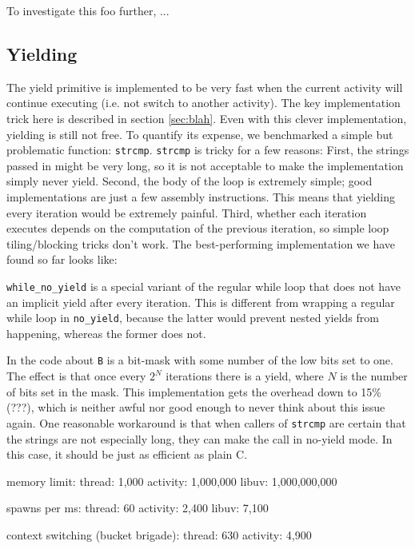 \documentclass[10pt,preprint]{sigplanconf}
\begin{document}
To investigate this foo further, ...

\subsection{Yielding}

The yield primitive is implemented to be very fast when the current activity will continue executing (i.e. not switch to another activity).
The key implementation trick here is described in section \ref{sec:blah}.
Even with this clever implementation, yielding is still not free.
To quantify its expense, we benchmarked a simple but problematic function: \texttt{strcmp}.
\texttt{strcmp} is tricky for a few reasons:
First, the strings passed in might be very long, so it is not acceptable to make the implementation simply never yield.
Second, the body of the loop is extremely simple; good implementations are just a few assembly instructions.
This means that yielding every iteration would be extremely painful.
Third, whether each iteration executes depends on the computation of the previous iteration, so simple loop tiling/blocking tricks don't work.
The best-performing implementation we have found so far looks like:


\texttt{while\_no\_yield} is a special variant of the regular while loop that does not have an implicit yield after every iteration.
This is different from wrapping a regular while loop in \texttt{no\_yield}, because the latter would prevent nested yields from happening, whereas the former does not.

In the code about \texttt{B} is a bit-mask with some number of the low bits set to one.
The effect is that once every $2^N$ iterations there is a yield, where $N$ is the number of bits set in the mask.
This implementation gets the overhead down to 15\% (???), which is neither awful nor good enough to never think about this issue again.
One reasonable workaround is that when callers of \texttt{strcmp} are certain that the strings are not especially long, they can make the call in no-yield mode.
In this case, it should be just as efficient as plain C.

memory limit: thread: 1,000 activity: 1,000,000 libuv: 1,000,000,000

spawns per ms: thread: 60 activity: 2,400 libuv: 7,100

context switching (bucket brigade): thread: 630  activity: 4,900
\end{document}
